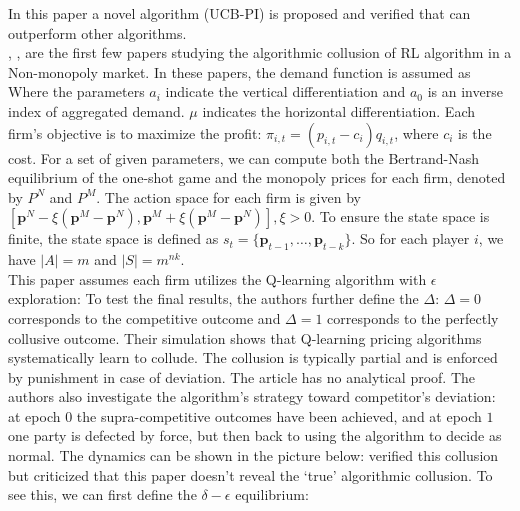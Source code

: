 \documentclass[10pt]{report}
\begin{document}
In this paper a novel algorithm (UCB-PI) is proposed and verified that can outperform other algorithms.\\
\cite{calvano2019algorithmic}, \cite{calvano2020artificial}, \cite{calvano2020protecting} are the first few papers studying the algorithmic collusion of RL algorithm in a Non-monopoly market. In these papers, the demand function is assumed as
Where the parameters $a_i$ indicate the vertical differentiation and $a_0$ is an inverse index of aggregated demand. $\mu$ indicates the horizontal differentiation. Each firm's objective is to maximize the profit: $\pi_{i,t}=\left(p_{i,t}-c_{i}\right)q_{i,t}$, where $c_i$ is the cost. For a set of given parameters, we can compute both the Bertrand-Nash equilibrium of the one-shot game and the monopoly prices for each firm, denoted by $P^N$ and $P^M$. The action space for each firm is given by $\left[\mathbf{p}^N-\xi(\mathbf{p}^M-\mathbf{p}^N),\mathbf{p}^M+\xi(\mathbf{p}^M-\mathbf{p}^N)\right], \xi>0$. To ensure the state space is finite, the state space is defined as $s_t=\{\mathbf{p}_{t-1},\ldots,\mathbf{p}_{t-k}\}$. So for each player $i$, we have $|A|=m$ and $|S|=m^{nk}$. \\
This paper assumes each firm utilizes the Q-learning algorithm with $\epsilon$ exploration:
To test the final results, the authors further define the  $\Delta$:
$\Delta=0$ corresponds to the competitive outcome and $\Delta=1$ corresponds to the perfectly collusive outcome. Their simulation shows that Q-learning pricing
algorithms systematically learn to collude. The collusion is typically partial and is enforced by punishment in case of deviation. The article has no analytical proof.
The authors also investigate the algorithm's strategy toward competitor's deviation: at epoch $0$ the supra-competitive outcomes have been achieved, and at epoch $1$ one party is defected by force, but then
back to using the algorithm to decide as normal. The dynamics can be shown in the picture below:
\cite{den2022artificial} verified this collusion but criticized that this paper doesn't reveal the `true' algorithmic collusion. To see this, we can first define the $\delta-\epsilon$ equilibrium:
\end{document}
